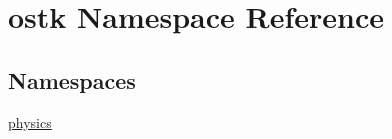 \hypertarget{namespaceostk}{}\section{ostk Namespace Reference}
\label{namespaceostk}
\subsection*{Namespaces}
\begin{DoxyCompactItemize}
\item 
 \hyperlink{namespaceostk_1_1physics}{physics}
\end{DoxyCompactItemize}
